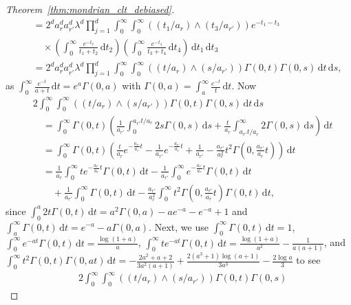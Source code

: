\documentclass[11pt,lof]{puthesis}
\newcommand{\diff}[1]{\,\mathrm{d}#1}
\theoremstyle{break}
\theoremstyle{proof}
\newtheorem{proof}{Proof}
\begin{document}
\begin{proof}[Theorem~\ref{thm:mondrian_clt_debiased}]
\begin{align*}
&\quad=
2^d a_r^d a_{r'}^d \lambda^d
\prod_{j=1}^d
\int_{0}^{\infty}
\int_{0}^{\infty}
((t_1 / a_r) \wedge (t_3 / a_{r'}))
e^{-t_1 - t_3} \\
&\qquad\times
\left(
\int_{0}^{\infty}
\frac{e^{-t_2}}{t_1 + t_2}
\diff t_2
\right)
\left(
\int_{0}^{\infty}
\frac{e^{-t_4}}{t_3 + t_4}
\diff t_4
\right)
\diff t_1
\diff t_3 \\
&\quad=
2^d a_r^d a_{r'}^d \lambda^d
\prod_{j=1}^d
\int_{0}^{\infty}
\int_{0}^{\infty}
((t / a_r) \wedge (s / a_{r'}))
\Gamma(0, t)
\Gamma(0, s)
\diff t
\diff s,
\end{align*}
%
as $\int_0^\infty \frac{e^{-t}}{a + t} \diff t = e^a \Gamma(0, a)$
with $\Gamma(0, a) = \int_a^\infty \frac{e^{-t}}{t} \diff t$. Now
%
\begin{align*}
&2
\int_{0}^{\infty}
\int_{0}^{\infty}
((t / a_r) \wedge (s / a_{r'}))
\Gamma(0, t)
\Gamma(0, s)
\diff t
\diff s \\
&\quad=
\int_0^\infty
\Gamma(0, t)
\left(
\frac{1}{a_{r'}}
\int_0^{a_{r'} t / a_r}
2 s \Gamma(0, s)
\diff{s}
+
\frac{t}{a_r}
\int_{a_{r'} t / a_r}^\infty
2 \Gamma(0, s)
\diff{s}
\right)
\diff{t} \\
&\quad=
\int_0^\infty
\Gamma(0, t)
\left(
\frac{t}{a_r}
e^{- \frac{a_{r'}}{a_r}t}
- \frac{1}{a_{r'}} e^{- \frac{a_{r'}}{a_r}t}
+ \frac{1}{a_{r'}}
- \frac{a_{r'}}{a_r^2} t^2
\Gamma\left(0, \frac{a_{r'}}{a_r} t\right)
\right)
\diff{t} \\
&\quad=
\frac{1}{a_r}
\int_0^\infty
t e^{- \frac{a_{r'}}{a_r} t}
\Gamma(0, t)
\diff{t}
- \frac{1}{a_{r'}}
\int_0^\infty
e^{- \frac{a_{r'}}{a_r} t}
\Gamma(0, t)
\diff{t} \\
&\qquad+
\frac{1}{a_{r'}}
\int_0^\infty
\Gamma(0, t)
\diff{t}
-
\frac{a_{r'}}{a_r^2}
\int_0^\infty
t^2 \Gamma\left(0, \frac{a_{r'}}{a_r} t\right)
\Gamma(0, t)
\diff{t},
\end{align*}
%
since
$\int_0^a 2 t \Gamma(0, t) \diff t = a^2 \Gamma(0, a) - a e^{-a} -e^{-a} + 1$
and
$\int_a^\infty \Gamma(0, t) \diff t = e^{-a} - a \Gamma(0, a)$.
Next, we use
%
$ \int_{0}^{\infty} \Gamma(0, t) \diff t = 1$,
$\int_{0}^{\infty} e^{-at} \Gamma(0, t) \diff t
= \frac{\log(1+a)}{a}$,
$\int_{0}^{\infty} t e^{-at} \Gamma(0, t) \diff t
= \frac{\log(1+a)}{a^2} - \frac{1}{a(a+1)}$,
and
$\int_{0}^{\infty} t^2 \Gamma(0, t) \Gamma(0, at) \diff t
= - \frac{2a^2 + a + 2}{3a^2 (a+1)} + \frac{2(a^3 + 1) \log(a+1)}{3a^3}
- \frac{2 \log a}{3}$
to see
%
\begin{align*}
&2
\int_{0}^{\infty}
\int_{0}^{\infty}
((t / a_r) \wedge (s / a_{r'}))
\Gamma(0, t)
\Gamma(0, s)

\end{align*}
\end{proof}
\end{document}
